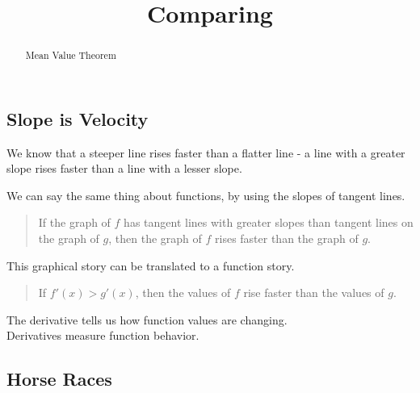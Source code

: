 \documentclass{ximera}
\title{Comparing}
\begin{document}
\begin{abstract}
Mean Value Theorem
\end{abstract}
\maketitle






\subsection*{Slope is Velocity}



We know that a steeper line rises faster than a flatter line - a line with a greater slope rises faster than a line with a lesser slope. 


We can say the same thing about functions, by using the slopes of tangent lines.


\begin{quote}

If the graph of $f$ has tangent lines with greater slopes than tangent lines on the graph of $g$, then the graph of $f$ rises faster than the graph of $g$.

\end{quote}


This graphical story can be translated to a function story.  


\begin{quote}

If $f'(x) > g'(x)$, then the values of $f$ rise faster than the values of $g$.

\end{quote}





The derivative tells us how function values are changing. \\

Derivatives measure function behavior. \\






















\subsection*{Horse Races}
\end{document}
